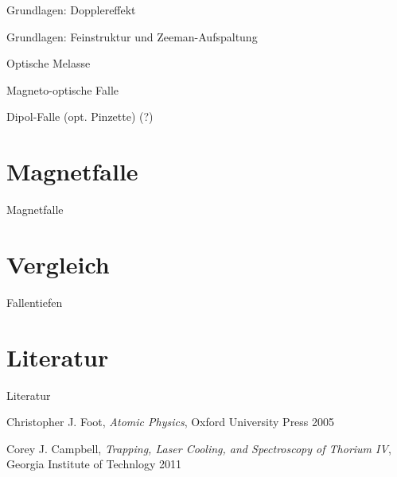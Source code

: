 \documentclass[12pt]{beamer}
\begin{document}
\begin{frame}{Grundlagen: Dopplereffekt}
\end{frame}

\begin{frame}{Grundlagen: Feinstruktur und Zeeman-Aufspaltung}
\end{frame}

\begin{frame}{Optische Melasse}
\end{frame}

\begin{frame}{Magneto-optische Falle}
\end{frame}

\begin{frame}{Dipol-Falle (opt. Pinzette) (?)}
\end{frame}


\section{Magnetfalle}

\begin{frame}{Magnetfalle}
\end{frame}


\section{Vergleich}

\begin{frame}{Fallentiefen}
\end{frame}

\section{Literatur}

\begin{frame}{Literatur}
	\begin{thebibliography}{9}
		Christopher J. Foot,
		\emph{Atomic Physics},
		Oxford University Press 2005
		
		Corey J. Campbell,
		\emph{Trapping, Laser Cooling, and Spectroscopy of Thorium IV},
		Georgia Institute of Technlogy 2011
		
	\end{thebibliography}
	
\end{frame}
\end{document}
